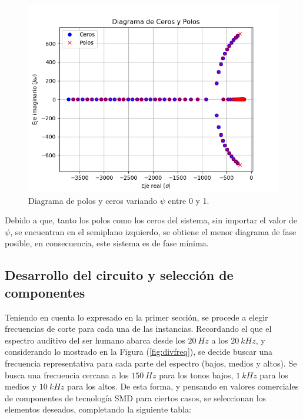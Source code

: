 \documentclass[a4paper]{article}
\begin{document}
\begin{figure}[H]
	\includegraphics[width=\textwidth]{Imagenes/Zplanepsi.png}
\caption{Diagrama de polos y ceros variando $\psi$ entre 0 y 1.}
	\label{fig:zplanepsi}
\end{figure}

Debido a que, tanto los polos como los ceros del sistema, sin importar el valor de $\psi$, se encuentran en el semiplano izquierdo, se obtiene el menor diagrama de fase posible, en consecuencia, este sistema es de fase mínima. 

\subsection{Desarrollo del circuito y selección de componentes}

Teniendo en cuenta lo expresado en la primer sección, se procede a elegir frecuencias de corte para cada una de las instancias. Recordando el que el espectro auditivo del ser humano abarca desde los $20 \ Hz$ a los $20 \ kHz$, y considerando lo mostrado en la Figura (\ref{fig:divfreq}), se decide buscar una frecuencia representativa para cada parte del espectro (bajos, medios y altos). Se busca una frecuencia cercana a los  $150 \ Hz$ para los tonos bajos, $1 \ kHz$ para los medios y $10 \ kHz$ para los altos. De esta forma, y pensando en valores comerciales de componentes de tecnología SMD para ciertos casos, se seleccionan los elementos deseados, completando la siguiente tabla:
\end{document}
